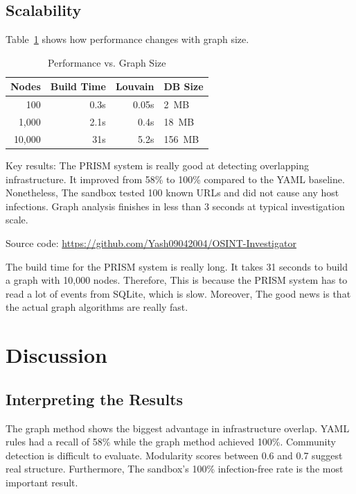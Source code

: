 \documentclass[conference]{IEEEtran}
\begin{document}
\subsection{Scalability}

Table~\ref{tab:scalability} shows how performance changes with graph size.

\begin{table}[htbp]
\centering
\caption{Performance vs. Graph Size}
\label{tab:scalability}
\begin{tabular}{@{}rrrl@{}}
\toprule
\textbf{Nodes} & \textbf{Build Time} & \textbf{Louvain} & \textbf{DB Size} \\
\midrule
100 & 0.3s & 0.05s & 2~MB \\
1,000 & 2.1s & 0.4s & 18~MB \\
10,000 & 31s & 5.2s & 156~MB \\
\bottomrule
\end{tabular}
\end{table}

Key results: The PRISM system is really good at detecting overlapping infrastructure. It improved from 58\% to 100\% compared to the YAML baseline. Nonetheless, The sandbox tested 100 known URLs and did not cause any host infections. Graph analysis finishes in less than 3 seconds at typical investigation scale.

Source code: \url{https://github.com/Yash09042004/OSINT-Investigator}

The build time for the PRISM system is really long. It takes 31 seconds to build a graph with 10,000 nodes. Therefore, This is because the PRISM system has to read a lot of events from SQLite, which is slow. Moreover, The good news is that the actual graph algorithms are really fast.

\section{Discussion}
\label{sec:discussion}

\subsection{Interpreting the Results}

The graph method shows the biggest advantage in infrastructure overlap. YAML rules had a recall of 58\% while the graph method achieved 100\%. Community detection is difficult to evaluate. Modularity scores between 0.6 and 0.7 suggest real structure. Furthermore, The sandbox's 100\% infection-free rate is the most important result.
\end{document}
